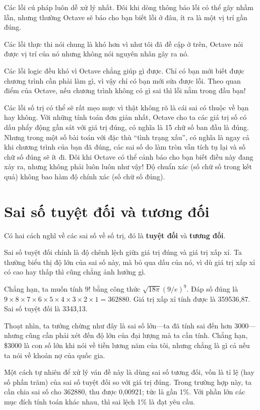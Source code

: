 \documentclass[12pt]{book}
\begin{document}
Các lỗi cú pháp luôn dễ xử lý nhất. Đôi khi dòng thông báo lỗi có thể
gây nhầm lẫn, nhưng thường Octave sẽ báo cho bạn biết lỗi ở đâu,
ít ra là một vị trí gần đúng.

Các lỗi thực thi nói chung là khó hơn vì như tôi đã đề cập ở trên, 
Octave nói được vị trí của nó nhưng không nói nguyên nhân gây ra nó.

Các lỗi logic đều khó vì Octave chẳng giúp gì được. Chỉ có bạn mới
biết được chương trình cần phải làm gì, vì vậy chỉ có bạn mới sửa được
lỗi. Theo quan điểm của Octave, nếu chương trình không có gì sai
thì lỗi nằm trong đầu bạn!

Các lỗi số trị có thể sẽ rất mẹo mực vì thật không rõ là cái sai có
thuộc về bạn hay không. Với những tính toán đơn giản nhất, 
Octave cho ta các giá trị số có dấu phẩy động gần sát với giá
trị đúng, có nghĩa là 15 chữ số ban đầu là đúng. Nhưng trong một số
bài toán với đặc thù ``tình trạng xấu'', có nghĩa là ngay cả khi 
chương trình của bạn đã đúng, các sai số do làm tròn vẫn tích tụ lại
và số chữ số đúng sẽ ít đi. Đôi khi Octave có thể cảnh báo cho bạn
biết điều này đang xảy ra, nhưng không phải luôn luôn như vậy! 
Độ chuẩn xác (số chữ số trong kết quả) không bao hàm độ
chính xác (số chữ số đúng).


\section{Sai số tuyệt đối và tương đối}

Có hai cách nghĩ về các sai số về số trị, đó là {\bf tuyệt đối}
và {\bf tương đối}.

Sai số tuyệt đối chính là độ chênh lệch giữa giá trị đúng và giá trị 
xấp xỉ. Ta thường biểu thị độ lớn của sai số này, mà bỏ qua dấu
của nó, vì dù giá trị xấp xỉ có cao hay thấp thì cũng chẳng ảnh
hưởng gì.

Chẳng hạn, ta muốn tính $9!$ bằng công thức $\sqrt
{18 \pi} ( 9 / e)^9$.  Đáp số đúng là $9 \times 8 \times 7 \times 6
\times 5 \times 4 \times 3 \times 2 \times 1 = 362880$.  Giá trị xấp xỉ
tính được là 359536,87. Sai số tuyệt đối là 3343,13.

Thoạt nhìn, ta tưởng chừng như đây là sai số lớn---ta đã 
tính sai đến hơn 3000---nhưng cũng cần phải xét đến độ lớn
của đại lượng mà ta cần tính. Chẳng hạn, \$3000 là con số lớn
khi nói về tiền lương năm của tôi, nhưng chẳng là gì cả nếu
ta nói về khoản nợ của quốc gia.

Một cách tự nhiên để xử lý ván đề này là dùng sai số tương đối,
vốn là tỉ lệ (hay số phần trăm) của sai số tuyệt đối so với 
giá trị đúng. Trong trường hợp này, ta cần chia sai số cho
362880, thu được 0,00921; tức là gần 1\%. Với phần lớn
các mục đích tính toán khác nhau, thì sai lệch 1\% là đạt yêu cầu.
\end{document}
